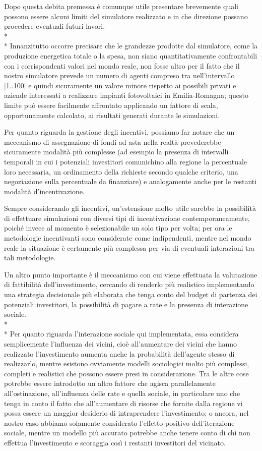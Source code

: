 \documentclass[12pt,a4paper,openright,twoside]{report}
\begin{document}
Dopo questa debita premessa è comunque utile presentare brevemente quali possono essere alcuni limiti del simulatore realizzato e in che direzione possano procedere eventuali futuri lavori.\\* \\*
Innanzitutto occorre precisare che le grandezze prodotte dal simulatore, come la produzione energetica totale o la spesa, non siano quantitativamente confrontabili con i corrispondenti valori nel mondo reale, non fosse altro per il fatto che il nostro simulatore prevede un numero di agenti compreso tra nell'intervallo [1..100] e quindi sicuramente un valore minore rispetto ai possibili privati e aziende interessati a realizzare impianti fotovoltaici in Emilia-Romagna; questo limite può essere facilmente affrontato applicando un fattore di scala, opportunamente calcolato, ai risultati generati durante le simulazioni.

Per quanto riguarda la gestione degli incentivi, possiamo far notare che un meccanismo di assegnazione di fondi ad asta nella realtà prevederebbe sicuramente modalità più complesse (ad esempio la presenza di intervalli temporali in cui i potenziali investitori comunichino alla regione la percentuale loro necessaria, un ordinamento della richieste secondo qualche criterio, una negoziazione sulla percentuale da finanziare) e analogamente anche per le restanti modalità d'incentivazione.

Sempre considerando gli incentivi, un'estensione molto utile sarebbe la possibilità di effettuare simulazioni con diversi tipi di incentivazione contemporaneamente, poiché invece al momento è selezionabile un solo tipo per volta; per ora le metodologie incentivanti sono considerate come indipendenti, mentre nel mondo reale la situazione è certamente più complessa per via di eventuali interazioni tra tali metodologie.

Un altro punto importante è il meccanismo con cui viene effettuata la valutazione di fattibilità dell'investimento, cercando di renderlo più realistico implementando una strategia decisionale più elaborata che tenga conto del budget di partenza dei potenziali investitori, la possibilità di pagare a rate e la presenza di interazione sociale.
\\* \\*
Per quanto riguarda l'interazione sociale qui implementata, essa considera semplicemente l’influenza dei vicini, cioè
all’aumentare dei vicini che hanno realizzato l’investimento aumenta anche la probabilità dell’agente stesso di realizzarlo, mentre esistono ovviamente modelli sociologici molto più complessi, completi e realistici che possono essere presi in considerazione. Tra le altre cose potrebbe essere introdotto un altro fattore che agisca parallelamente all'ostinazione, all'influenza delle rate e quella sociale, in particolare uno che tenga in conto il fatto che all’aumentare di risorse che fornite dalla regione vi possa essere un maggior desiderio di intraprendere l’investimento; o ancora, nel nostro caso abbiamo solamente considerato l'effetto positivo dell'iterazione sociale, mentre un modello più accurato potrebbe anche tenere conto di chi non effettua l'investimento e scoraggia così i restanti investitori del vicinato.




\nocite{*}


\end{document}
